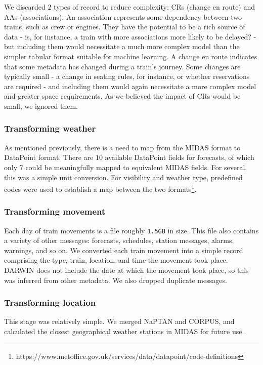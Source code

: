 \documentclass[12pt,a4paper]{article}
\begin{document}
We discarded $2$ types of record to reduce complexity: CRs (change en route) and AAs (associations). An association represents some dependency between two trains, such as crew or engines. They have the potential to be a rich source of data - is, for instance, a train with more associations more likely to be delayed? - but including them would necessitate a much more complex model than the simpler tabular format suitable for machine learning. A change en route indicates that some metadata has changed during a train's journey. Some changes are typically small - a change in seating rules, for instance, or whether reservations are required - and including them would again necessitate a more complex model and greater space requirements. As we believed the impact of CRs would be small, we ignored them.

\subsubsection{Transforming weather}

As mentioned previously, there is a need to map from the MIDAS format to DataPoint format. There are $10$ available DataPoint fields for forecasts, of which only $7$ could be meaningfully mapped to equivalent MIDAS fields. For several, this was a simple unit conversion. For visibility and weather type, predefined codes were used to establish a map between the two formats\footnote{https://www.metoffice.gov.uk/services/data/datapoint/code-definitions}. 

\subsubsection{Transforming movement}

Each day of train movements is a file roughly \verb|1.5GB| in size. This file also contains a variety of other messages: forecasts, schedules, station messages, alarms, warnings, and so on. We converted each train movement into a simple record comprising the type, train, location, and time the movement took place. DARWIN does not include the date at which the movement took place, so this was inferred from other metadata. We also dropped duplicate messages.

\subsubsection{Transforming location}

This stage was relatively simple. We merged NaPTAN and CORPUS, and calculated the closest geographical weather stations in MIDAS for future use.. 
\end{document}
